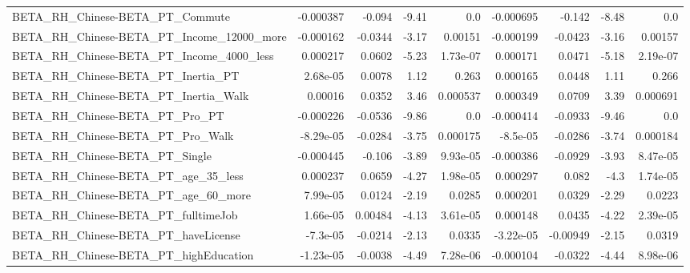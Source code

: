 \begin{tabular}{lrrrrrrrr}
BETA\_RH\_Chinese-BETA\_PT\_Commute                    &   -0.000387 &       -0.094 &    -9.41 &      0.0 &  -0.000695 &      -0.142 &        -8.48 &           0.0 \\
BETA\_RH\_Chinese-BETA\_PT\_Income\_12000\_more          &   -0.000162 &      -0.0344 &    -3.17 &  0.00151 &  -0.000199 &     -0.0423 &        -3.16 &       0.00157 \\
BETA\_RH\_Chinese-BETA\_PT\_Income\_4000\_less           &    0.000217 &       0.0602 &    -5.23 & 1.73e-07 &   0.000171 &      0.0471 &        -5.18 &      2.19e-07 \\
BETA\_RH\_Chinese-BETA\_PT\_Inertia\_PT                 &    2.68e-05 &       0.0078 &     1.12 &    0.263 &   0.000165 &      0.0448 &         1.11 &         0.266 \\
BETA\_RH\_Chinese-BETA\_PT\_Inertia\_Walk               &     0.00016 &       0.0352 &     3.46 & 0.000537 &   0.000349 &      0.0709 &         3.39 &      0.000691 \\
BETA\_RH\_Chinese-BETA\_PT\_Pro\_PT                     &   -0.000226 &      -0.0536 &    -9.86 &      0.0 &  -0.000414 &     -0.0933 &        -9.46 &           0.0 \\
BETA\_RH\_Chinese-BETA\_PT\_Pro\_Walk                   &   -8.29e-05 &      -0.0284 &    -3.75 & 0.000175 &   -8.5e-05 &     -0.0286 &        -3.74 &      0.000184 \\
BETA\_RH\_Chinese-BETA\_PT\_Single                     &   -0.000445 &       -0.106 &    -3.89 & 9.93e-05 &  -0.000386 &     -0.0929 &        -3.93 &      8.47e-05 \\
BETA\_RH\_Chinese-BETA\_PT\_age\_35\_less                &    0.000237 &       0.0659 &    -4.27 & 1.98e-05 &   0.000297 &       0.082 &         -4.3 &      1.74e-05 \\
BETA\_RH\_Chinese-BETA\_PT\_age\_60\_more                &    7.99e-05 &       0.0124 &    -2.19 &   0.0285 &   0.000201 &      0.0329 &        -2.29 &        0.0223 \\
BETA\_RH\_Chinese-BETA\_PT\_fulltimeJob                &    1.66e-05 &      0.00484 &    -4.13 & 3.61e-05 &   0.000148 &      0.0435 &        -4.22 &      2.39e-05 \\
BETA\_RH\_Chinese-BETA\_PT\_haveLicense                &    -7.3e-05 &      -0.0214 &    -2.13 &   0.0335 &  -3.22e-05 &    -0.00949 &        -2.15 &        0.0319 \\
BETA\_RH\_Chinese-BETA\_PT\_highEducation              &   -1.23e-05 &      -0.0038 &    -4.49 & 7.28e-06 &  -0.000104 &     -0.0322 &        -4.44 &      8.98e-06 \\

\end{tabular}
